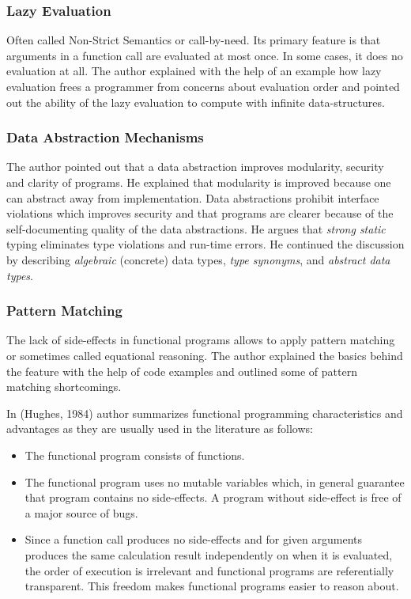 \documentclass[12pt,twoside,a4paper]{report}
\begin{document}
\subsubsection{Lazy Evaluation}
Often called Non-Strict Semantics or call-by-need. Its primary feature is that arguments in a function call are evaluated at most once. In some cases, it does no evaluation at all. The author
explained with the help of an example how lazy evaluation frees a programmer from concerns about evaluation order and pointed out the ability of the lazy evaluation to compute with infinite
data-structures.

\subsubsection{Data Abstraction Mechanisms}
The author pointed out that a data abstraction improves modularity, security and clarity of programs. He explained that modularity is improved because one can abstract away from
implementation. Data abstractions prohibit interface violations which improves security and that programs are clearer because of the self-documenting quality of the data abstractions. He argues
that \textit{strong static} typing eliminates type violations and run-time errors. He continued the discussion by describing \textit{algebraic} (concrete) data types, \textit{type synonyms}, and \textit{abstract data types}.

\subsubsection{Pattern Matching}
The lack of side-effects in functional programs allows to apply pattern matching or sometimes called equational reasoning. The author explained the basics behind the feature with the help of
code examples and outlined some of pattern matching shortcomings.

In (Hughes, 1984) author summarizes functional programming characteristics and advantages as they are usually used in the literature as follows:

\begin{itemize}
\item The functional program consists of functions.
\item The functional program uses no mutable variables which, in general guarantee that program contains no side-effects. A program without side-effect is free of a major source of bugs.
\item Since a function call produces no side-effects and for given arguments produces the same calculation result independently on when it is evaluated, the order of execution is irrelevant and functional programs are referentially transparent. This freedom makes functional programs easier to reason about.
\end{itemize}
\end{document}
